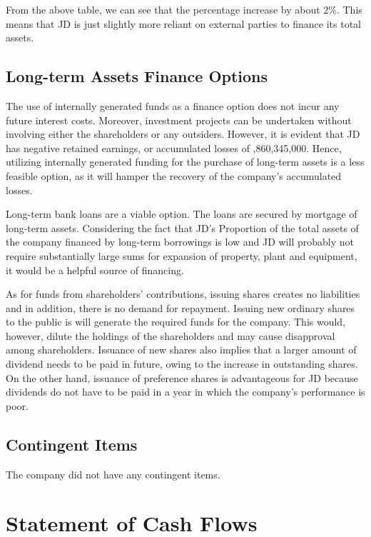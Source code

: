 From the above table, we can see that the percentage increase by about 2\%. This means that JD is just slightly more reliant on external parties to finance its total assets. 

\subsection{Long-term Assets Finance Options}
The use of internally generated funds as a finance option does not incur any future interest costs. Moreover, investment projects can be undertaken without involving either the shareholders or any outsiders. However, it is evident that JD has negative retained earnings, or accumulated losses of ,860,345,000. Hence, utilizing internally generated funding for the purchase of long-term assets is a less feasible option, as it will hamper the recovery of the company’s accumulated losses. 

Long-term bank loans are a viable option. The loans are secured by mortgage of long-term assets. Considering the fact that JD’s Proportion of the total assets of the company financed by long-term borrowings is low and JD will probably not require substantially large sums for expansion of property, plant and equipment, it would be a helpful source of financing.  

As for funds from shareholders’ contributions, issuing shares creates no liabilities and in addition, there is no demand for repayment. Issuing new ordinary shares to the public is will generate the required funds for the company. This would, however, dilute the holdings of the shareholders and may cause disapproval among shareholders. Issuance of new shares also implies that a larger amount of dividend needs to be paid in future, owing to the increase in outstanding shares. On the other hand, issuance of preference shares is advantageous for JD because dividends do not have to be paid in a year in which the company’s performance is poor.  

\subsection{Contingent Items}
The company did not have any contingent items.

\section{Statement of Cash Flows}
